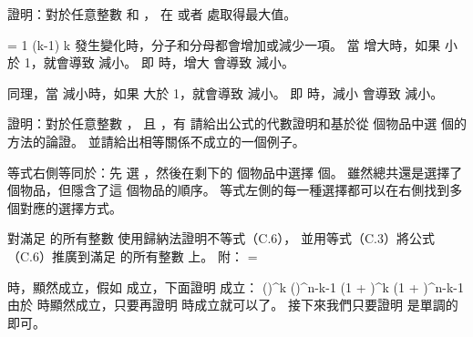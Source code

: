 \startEXERCISE
證明：對於任意整數  和 ，
  在  或者
  處取得最大值。
\stopEXERCISE

\startANSWER
\startformula
{} = 
{1 \cdots (k-1) \cdot k}
\stopformula
{} 發生變化時，分子和分母都會增加或減少一項。
當  增大時，如果  小於 1，就會導致  減小。
即  時，增大  會導致  減小。

同理，當  減小時，如果  大於 1，就會導致  減小。
即  時，減小  會導致  減小。
\stopANSWER

\startEXERCISE\DIFFICULT
證明：對於任意整數 ，
且 ，有
\startformula
{}\le {} 
\stopformula
請給出公式的代數證明和基於從  個物品中選  個的方法的論證。
並請給出相等關係不成立的一個例子。
\stopEXERCISE

\startANSWER
等式右側等同於：先  選 ，然後在剩下的  個物品中選擇  個。
雖然總共還是選擇了  個物品，但隱含了這  個物品的順序。
等式左側的每一種選擇都可以在右側找到多個對應的選擇方式。
\stopANSWER

\startEXERCISE\DIFFICULT
對滿足  的所有整數  使用歸納法證明不等式（C.6），
並用等式（C.3）將公式（C.6）推廣到滿足  的所有整數  上。
附：
\startformula
{} =  
\stopformula
\startformula
{} \le {} 
\stopformula
\stopEXERCISE

\startANSWER
\startformula\startmathalignment[n=1]
\NC {}\le {} \NR
\NC \Updownarrow \NR
\NC {} \le {} \NR
\stopmathalignment\stopformula

 時，顯然成立，假如  成立，下面證明  成立：
\startformula\startmathalignment[n=1]
\NC {}\le {} \NR
\NC \Updownarrow \NR
\NC {}\cdot {} \le {} \NR
\NC \Updownarrow \NR
\NC {}\cdot {}
    \le {} \cdot {}
    \le {} \NR
\NC \Updownarrow \NR
\NC {} \le {} \NR
\NC \Updownarrow \NR
\NC \left(\right)^{k} \le \left(\right)^{n-k-1} \NR
\NC \Updownarrow \NR
\NC \left(1 + \right)^{k} \le \left(1 + \right)^{n-k-1} \NR
\stopmathalignment\stopformula
由於  時顯然成立，只要再證明  時成立就可以了。
接下來我們只要證明  是單調的即可。

